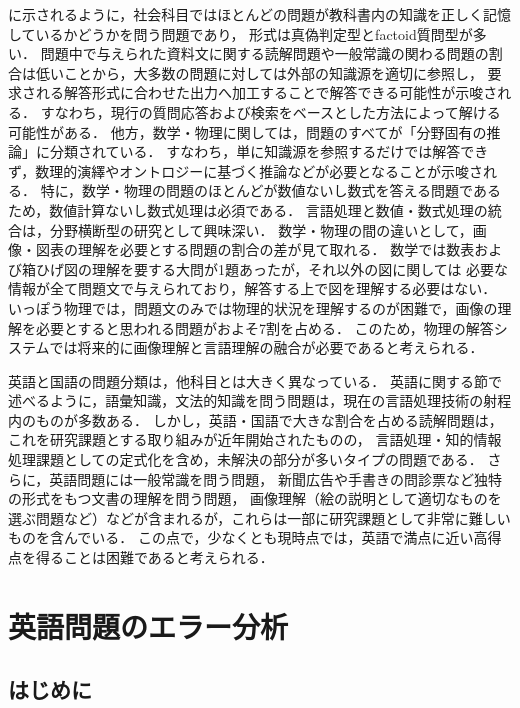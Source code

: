 \documentclass[japanese]{jnlp_1.4b}
\def\TABREF#1{}
\begin{document}
\TABREF{tab:overview:risha}に示されるように，社会科目ではほとんどの問題が教科書内の知識を正しく記憶しているかどうかを問う問題であり，
形式は真偽判定型とfactoid質問型が多い．
問題中で与えられた資料文に関する読解問題や一般常識の関わる問題の割合は低いことから，大多数の問題に対しては外部の知識源を適切に参照し，
要求される解答形式に合わせた出力へ加工することで解答できる可能性が示唆される．
すなわち，現行の質問応答および検索をベースとした方法によって解ける可能性がある．
他方，数学・物理に関しては，問題のすべてが「分野固有の推論」に分類されている．
すなわち，単に知識源を参照するだけでは解答できず，数理的演繹やオントロジーに基づく推論などが必要となることが示唆される．
特に，数学・物理の問題のほとんどが数値ないし数式を答える問題であるため，数値計算ないし数式処理は必須である．
言語処理と数値・数式処理の統合は，分野横断型の研究として興味深い．
数学・物理の間の違いとして，画像・図表の理解を必要とする問題の割合の差が見て取れる．
数学では数表および箱ひげ図の理解を要する大問が1題あったが，それ以外の図に関しては
必要な情報が全て問題文で与えられており，解答する上で図を理解する必要はない．
いっぽう物理では，問題文のみでは物理的状況を理解するのが困難で，画像の理解を必要とすると思われる問題がおよそ7割を占める．
このため，物理の解答システムでは将来的に画像理解と言語理解の融合が必要であると考えられる．


英語と国語の問題分類は，他科目とは大きく異なっている．
英語に関する節で述べるように，語彙知識，文法的知識を問う問題は，現在の言語処理技術の射程内のものが多数ある．
しかし，英語・国語で大きな割合を占める読解問題は，これを研究課題とする取り組みが近年開始されたものの\cite{Penas2011a,Penas2011b}，
言語処理・知的情報処理課題としての定式化を含め，未解決の部分が多いタイプの問題である．
さらに，英語問題には一般常識を問う問題，
新聞広告や手書きの問診票など独特の形式をもつ文書の理解を問う問題，
画像理解（絵の説明として適切なものを選ぶ問題など）などが含まれるが，これらは一部に研究課題として非常に難しいものを含んでいる．
この点で，少なくとも現時点では，英語で満点に近い高得点を得ることは困難であると考えられる．



\section{英語問題のエラー分析}

\subsection{はじめに}
\label{sec:eigo:introduction}
\end{document}
